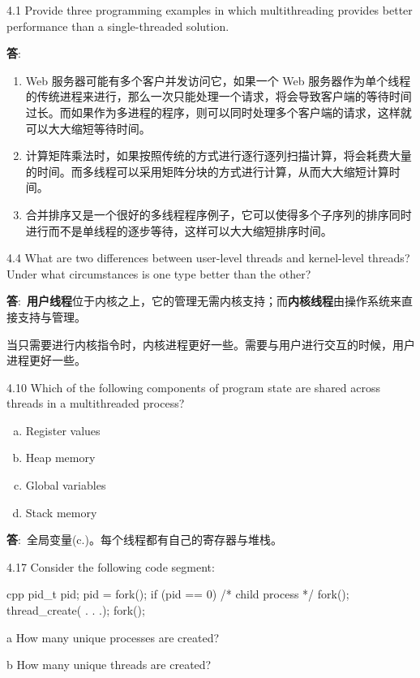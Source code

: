 \documentclass[12pt,a4paper]{article}
\newenvironment{problems}{\begin{list}{}{\renewcommand{\makelabel}[1]{\textbf{##1}\hfil}}}{\end{list}}
\newenvironment{steps}{\begin{list}{}{\renewcommand{\makelabel}[1]{##1.\hfil}}}{\end{list}}
\providecommand{\ans}{\textbf{答}:~}
\begin{document}
\begin{problems}
    \item[4.1] Provide three programming examples in which multithreading provides
    better performance than a single-threaded solution.

    \ans \begin{enumerate}
        \item Web 服务器可能有多个客户并发访问它，如果一个 Web 服务器作为单个线程的传统进程来进行，那么一次只能处理一个请求，将会导致客户端的等待时间过长。而如果作为多进程的程序，则可以同时处理多个客户端的请求，这样就可以大大缩短等待时间。
        \item 计算矩阵乘法时，如果按照传统的方式进行逐行逐列扫描计算，将会耗费大量的时间。而多线程可以采用矩阵分块的方式进行计算，从而大大缩短计算时间。
        \item 合并排序又是一个很好的多线程程序例子，它可以使得多个子序列的排序同时进行而不是单线程的逐步等待，这样可以大大缩短排序时间。
    \end{enumerate}
    \item[4.4] What are two differences between user-level threads and kernel-level
    threads? Under what circumstances is one type better than the other?
    
    \ans \textbf{用户线程}位于内核之上，它的管理无需内核支持；而\textbf{内核线程}由操作系统来直接支持与管理。

    当只需要进行内核指令时，内核进程更好一些。需要与用户进行交互的时候，用户进程更好一些。
    \item[4.10] Which of the following components of program state are shared across
    threads in a multithreaded process?
    \begin{enumerate}[a.]
        \item Register values
        \item Heap memory
        \item Global variables
        \item Stack memory
    \end{enumerate}

    \ans 全局变量(c.)。每个线程都有自己的寄存器与堆栈。
    \item[4.17] Consider the following code segment:
    \begin{code}{cpp}
pid_t pid;
pid = fork();
if (pid == 0) { /* child process */
    fork();
    thread_create( . . .);
}
fork();
    \end{code} 
    \begin{steps}
        \item[a] How many unique processes are created?
        \item[b] How many unique threads are created?
    \end{steps}
    

\end{problems}
\end{document}
